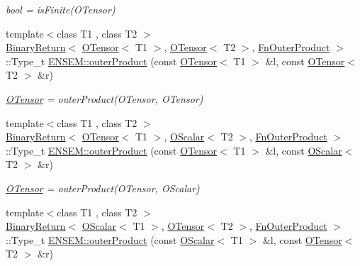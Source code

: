 \begin{DoxyCompactItemize}
\begin{DoxyCompactList}\small\item\em bool = is\+Finite(\+O\+Tensor) \end{DoxyCompactList}\item 
{\footnotesize template$<$class T1 , class T2 $>$ }\\\mbox{\hyperlink{structENSEM_1_1BinaryReturn}{Binary\+Return}}$<$ \mbox{\hyperlink{classENSEM_1_1OTensor}{O\+Tensor}}$<$ T1 $>$, \mbox{\hyperlink{classENSEM_1_1OTensor}{O\+Tensor}}$<$ T2 $>$, \mbox{\hyperlink{structENSEM_1_1FnOuterProduct}{Fn\+Outer\+Product}} $>$\+::Type\+\_\+t \mbox{\hyperlink{group__obstensor_ga89521e9a934b14066eac700fe2539b53}{E\+N\+S\+E\+M\+::outer\+Product}} (const \mbox{\hyperlink{classENSEM_1_1OTensor}{O\+Tensor}}$<$ T1 $>$ \&l, const \mbox{\hyperlink{classENSEM_1_1OTensor}{O\+Tensor}}$<$ T2 $>$ \&r)
\begin{DoxyCompactList}\small\item\em \mbox{\hyperlink{classENSEM_1_1OTensor}{O\+Tensor}} = outer\+Product(\+O\+Tensor, O\+Tensor) \end{DoxyCompactList}\item 
{\footnotesize template$<$class T1 , class T2 $>$ }\\\mbox{\hyperlink{structENSEM_1_1BinaryReturn}{Binary\+Return}}$<$ \mbox{\hyperlink{classENSEM_1_1OTensor}{O\+Tensor}}$<$ T1 $>$, \mbox{\hyperlink{classENSEM_1_1OScalar}{O\+Scalar}}$<$ T2 $>$, \mbox{\hyperlink{structENSEM_1_1FnOuterProduct}{Fn\+Outer\+Product}} $>$\+::Type\+\_\+t \mbox{\hyperlink{group__obstensor_ga2f3f321adaac09837bf726a64c539c11}{E\+N\+S\+E\+M\+::outer\+Product}} (const \mbox{\hyperlink{classENSEM_1_1OTensor}{O\+Tensor}}$<$ T1 $>$ \&l, const \mbox{\hyperlink{classENSEM_1_1OScalar}{O\+Scalar}}$<$ T2 $>$ \&r)
\begin{DoxyCompactList}\small\item\em \mbox{\hyperlink{classENSEM_1_1OTensor}{O\+Tensor}} = outer\+Product(\+O\+Tensor, O\+Scalar) \end{DoxyCompactList}\item 
{\footnotesize template$<$class T1 , class T2 $>$ }\\\mbox{\hyperlink{structENSEM_1_1BinaryReturn}{Binary\+Return}}$<$ \mbox{\hyperlink{classENSEM_1_1OScalar}{O\+Scalar}}$<$ T1 $>$, \mbox{\hyperlink{classENSEM_1_1OTensor}{O\+Tensor}}$<$ T2 $>$, \mbox{\hyperlink{structENSEM_1_1FnOuterProduct}{Fn\+Outer\+Product}} $>$\+::Type\+\_\+t \mbox{\hyperlink{group__obstensor_ga4b391fbdb7626ccda42a2068c3ff5ba2}{E\+N\+S\+E\+M\+::outer\+Product}} (const \mbox{\hyperlink{classENSEM_1_1OScalar}{O\+Scalar}}$<$ T1 $>$ \&l, const \mbox{\hyperlink{classENSEM_1_1OTensor}{O\+Tensor}}$<$ T2 $>$ \&r)

\end{DoxyCompactItemize}
